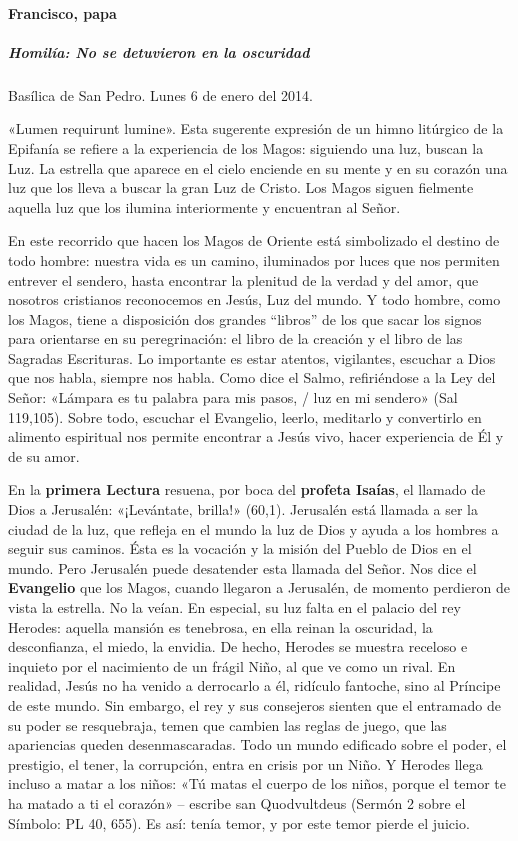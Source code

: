 \documentclass[]{article}
\let\oldparagraph\paragraph
\renewcommand{\paragraph}[1]{\oldparagraph{#1}\mbox{}}
\let\oldsubparagraph\subparagraph
\renewcommand{\subparagraph}[1]{\oldsubparagraph{#1}\mbox{}}
\begin{document}
\paragraph{Francisco, papa}\label{francisco-papa-8}

\subparagraph{Homilía: No se detuvieron en la
oscuridad}\label{homiluxeda-no-se-detuvieron-en-la-oscuridad}

Basílica de San Pedro. Lunes 6 de enero del 2014.

«Lumen requirunt lumine». Esta sugerente expresión de un himno litúrgico
de la Epifanía se refiere a la experiencia de los Magos: siguiendo una
luz, buscan la Luz. La estrella que aparece en el cielo enciende en su
mente y en su corazón una luz que los lleva a buscar la gran Luz de
Cristo. Los Magos siguen fielmente aquella luz que los ilumina
interiormente y encuentran al Señor.

En este recorrido que hacen los Magos de Oriente está simbolizado el
destino de todo hombre: nuestra vida es un camino, iluminados por luces
que nos permiten entrever el sendero, hasta encontrar la plenitud de la
verdad y del amor, que nosotros cristianos reconocemos en Jesús, Luz del
mundo. Y todo hombre, como los Magos, tiene a disposición dos grandes
``libros'' de los que sacar los signos para orientarse en su
peregrinación: el libro de la creación y el libro de las Sagradas
Escrituras. Lo importante es estar atentos, vigilantes, escuchar a Dios
que nos habla, siempre nos habla. Como dice el Salmo, refiriéndose a la
Ley del Señor: «Lámpara es tu palabra para mis pasos, / luz en mi
sendero» (Sal 119,105). Sobre todo, escuchar el Evangelio, leerlo,
meditarlo y convertirlo en alimento espiritual nos permite encontrar a
Jesús vivo, hacer experiencia de Él y de su amor.

En la \textbf{primera Lectura} resuena, por boca del \textbf{profeta
Isaías}, el llamado de Dios a Jerusalén: «¡Levántate, brilla!» (60,1).
Jerusalén está llamada a ser la ciudad de la luz, que refleja en el
mundo la luz de Dios y ayuda a los hombres a seguir sus caminos. Ésta es
la vocación y la misión del Pueblo de Dios en el mundo. Pero Jerusalén
puede desatender esta llamada del Señor. Nos dice el \textbf{Evangelio}
que los Magos, cuando llegaron a Jerusalén, de momento perdieron de
vista la estrella. No la veían. En especial, su luz falta en el palacio
del rey Herodes: aquella mansión es tenebrosa, en ella reinan la
oscuridad, la desconfianza, el miedo, la envidia. De hecho, Herodes se
muestra receloso e inquieto por el nacimiento de un frágil Niño, al que
ve como un rival. En realidad, Jesús no ha venido a derrocarlo a él,
ridículo fantoche, sino al Príncipe de este mundo. Sin embargo, el rey y
sus consejeros sienten que el entramado de su poder se resquebraja,
temen que cambien las reglas de juego, que las apariencias queden
desenmascaradas. Todo un mundo edificado sobre el poder, el prestigio,
el tener, la corrupción, entra en crisis por un Niño. Y Herodes llega
incluso a matar a los niños: «Tú matas el cuerpo de los niños, porque el
temor te ha matado a ti el corazón» -- escribe san Quodvultdeus (Sermón
2 sobre el Símbolo: PL 40, 655). Es así: tenía temor, y por este temor
pierde el juicio.
\end{document}
